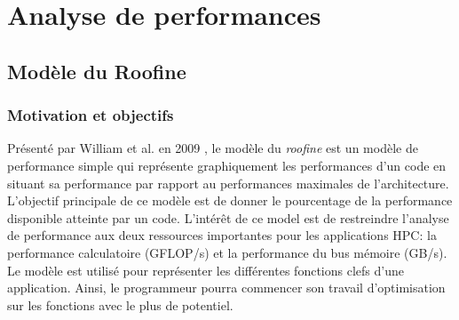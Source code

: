 \section{Analyse de performances}

\subsection{Modèle du Roofine} \label{sec:roofline}

\subsubsection{Motivation et objectifs}

Présenté par William et al. en 2009 \cite{Williams2008}, le modèle du \textit{roofine} est un modèle de performance simple qui représente graphiquement les performances d’un code en situant sa performance par rapport au performances maximales de l’architecture. L’objectif principale de ce modèle est de donner le pourcentage de la performance disponible atteinte par un code. L’intérêt de ce model est de restreindre l’analyse de performance aux deux ressources importantes pour les applications HPC: la performance calculatoire (GFLOP/s) et la performance du bus mémoire (GB/s).
Le modèle est utilisé pour représenter les différentes fonctions clefs d’une application. Ainsi, le programmeur pourra commencer son travail d’optimisation sur les fonctions avec le plus de potentiel.

